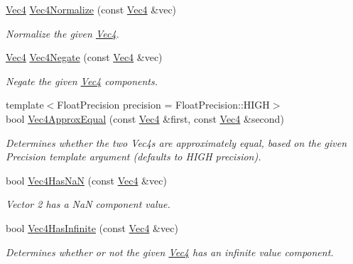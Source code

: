 \begin{DoxyCompactItemize}
\hyperlink{classgfxmath_1_1_vec4}{Vec4} \hyperlink{classgfxmath_1_1_vec4_af1fa3fbf9843a509f3b8a476aa18361b}{Vec4\+Normalize} (const \hyperlink{classgfxmath_1_1_vec4}{Vec4} \&vec)
\begin{DoxyCompactList}\small\item\em Normalize the given \hyperlink{classgfxmath_1_1_vec4}{Vec4}. \end{DoxyCompactList}\item 
\hyperlink{classgfxmath_1_1_vec4}{Vec4} \hyperlink{classgfxmath_1_1_vec4_a9ba6951d54c6a4d9d513580f5bf3b928}{Vec4\+Negate} (const \hyperlink{classgfxmath_1_1_vec4}{Vec4} \&vec)
\begin{DoxyCompactList}\small\item\em Negate the given \hyperlink{classgfxmath_1_1_vec4}{Vec4} components. \end{DoxyCompactList}\item 
{\footnotesize template$<$Float\+Precision precision = Float\+Precision\+::\+H\+I\+G\+H$>$ }\\bool \hyperlink{classgfxmath_1_1_vec4_a819b8c958e12f0838288c641af7e1ab6}{Vec4\+Approx\+Equal} (const \hyperlink{classgfxmath_1_1_vec4}{Vec4} \&first, const \hyperlink{classgfxmath_1_1_vec4}{Vec4} \&second)
\begin{DoxyCompactList}\small\item\em Determines whether the two Vec4s are approximately equal, based on the given Precision template argument (defaults to H\+I\+G\+H precision). \end{DoxyCompactList}\item 
bool \hyperlink{classgfxmath_1_1_vec4_ab82fdfebe73934664b56e9ba1174f37f}{Vec4\+Has\+Na\+N} (const \hyperlink{classgfxmath_1_1_vec4}{Vec4} \&vec)
\begin{DoxyCompactList}\small\item\em Vector 2 has a Na\+N component value. \end{DoxyCompactList}\item 
bool \hyperlink{classgfxmath_1_1_vec4_a29cd467d514b701c3a796cb75234be0b}{Vec4\+Has\+Infinite} (const \hyperlink{classgfxmath_1_1_vec4}{Vec4} \&vec)
\begin{DoxyCompactList}\small\item\em Determines whether or not the given \hyperlink{classgfxmath_1_1_vec4}{Vec4} has an infinite value component. \end{DoxyCompactList}\end{DoxyCompactItemize}



